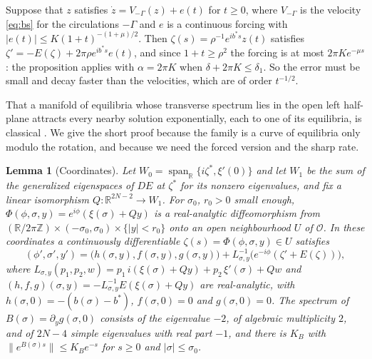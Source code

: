 \documentclass[11pt]{article}
\newtheorem{lemma}{Lemma}
\theoremstyle{definition}
\newcommand{\R}{\mathbb{R}}
\begin{document}
Suppose that $z$ satisfies $\dot z = V_{-\Gamma}(z) + e(t)$ for $t \ge 0$, where $V_{-\Gamma}$ is the velocity \eqref{eq:bs} for the circulations $-\Gamma$ and $e$ is a continuous forcing with $|e(t)| \le K(1 + t)^{-(1+\mu)/2}$. Then $\zeta(s) = \rho^{-1}e^{ib^*s}z(t)$ satisfies $\zeta' = -E(\zeta) + 2\pi\rho e^{ib^*s}e(t)$, and since $1 + t \ge \rho^2$ the forcing is at most $2\pi Ke^{-\mu s}$: the proposition applies with $\alpha = 2\pi K$ when $\delta + 2\pi K \le \delta_1$. So the error must be small and decay faster than the velocities, which are of order $t^{-1/2}$.

That a manifold of equilibria whose transverse spectrum lies in the open left half-plane attracts every nearby solution exponentially, each to one of its equilibria, is classical \cite{aulbach1984}. We give the short proof because the family is a curve of equilibria only modulo the rotation, and because we need the forced version and the sharp rate.

\begin{lemma}[Coordinates]\label{lem:coords}
Let $W_0 = \operatorname{span}_\R\{i\zeta^*, \xi'(0)\}$ and let $W_1$ be the sum of the generalized eigenspaces of $DE$ at $\zeta^*$ for its nonzero eigenvalues, and fix a linear isomorphism $Q: \R^{2N-2} \to W_1$. For $\sigma_0$, $r_0 > 0$ small enough, $\Phi(\phi, \sigma, y) = e^{i\phi}(\xi(\sigma) + Qy)$ is a real-analytic diffeomorphism from $(\R/2\pi\mathbb Z) \times (-\sigma_0, \sigma_0) \times \{|y| < r_0\}$ onto an open neighbourhood $U$ of $\mathcal O$. In these coordinates a continuously differentiable $\zeta(s) = \Phi(\phi, \sigma, y) \in U$ satisfies
\begin{equation}\label{eq:coords}
  (\phi', \sigma', y') = \bigl(h(\sigma, y), f(\sigma, y), g(\sigma, y)\bigr) + L_{\sigma, y}^{-1}\bigl(e^{-i\phi}(\zeta' + E(\zeta))\bigr),
\end{equation}
where $L_{\sigma,y}(p_1, p_2, w) = p_1\,i(\xi(\sigma) + Qy) + p_2\,\xi'(\sigma) + Qw$ and $(h, f, g)(\sigma, y) = -L_{\sigma,y}^{-1}E(\xi(\sigma) + Qy)$ are real-analytic, with $h(\sigma, 0) = -(b(\sigma) - b^*)$, $f(\sigma, 0) = 0$ and $g(\sigma, 0) = 0$. The spectrum of $B(\sigma) = \partial_yg(\sigma, 0)$ consists of the eigenvalue $-2$, of algebraic multiplicity $2$, and of $2N - 4$ simple eigenvalues with real part $-1$, and there is $K_B$ with $\|e^{B(\sigma)s}\| \le K_Be^{-s}$ for $s \ge 0$ and $|\sigma| \le \sigma_0$.
\end{lemma}
\end{document}
